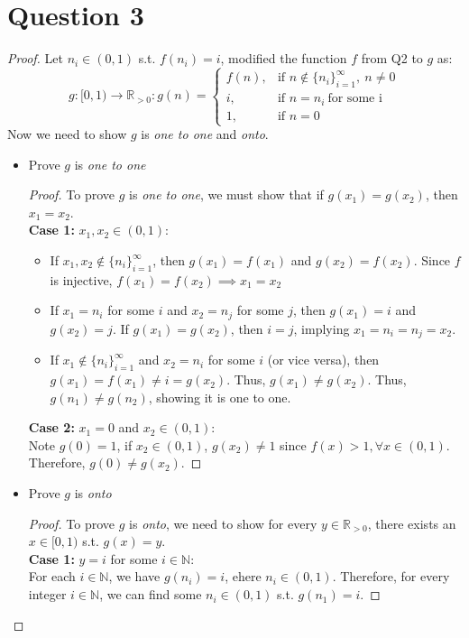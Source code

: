 \documentclass{article}
\begin{document}
\section*{Question 3}
\begin{proof}
    Let $n_i \in (0,1)$ s.t. $f(n_i) = i$, modified the function $f$ from Q2 to $g$ as:
    \[ g: [0,1) \rightarrow \mathbb{R}_{>0} 
    : g(n) =
        \begin{cases}
            f(n), & \text{if } n \notin \{n_i\}_{i=1}^{\infty}, \ n \neq 0 \\
            i, & \text{if } n = n_i \ \text{for some i} \\
            1, & \text{if } n = 0
        \end{cases}
    \]
    Now we need to show $g$ is \textit{one to one} and \textit{onto}.
    \begin{itemize}
        \item Prove $g$ is \textit{one to one}
        \begin{proof}
            To prove $g$ is \textit{one to one}, we must show that if $g(x_1) = g(x_2)$, then $x_1 = x_2$.
            \\
            \textbf{Case 1:} \( x_1, x_2 \in (0, 1) \):
            \begin{itemize}
                \item If \( x_1, x_2 \notin \{n_i\}_{i=1}^\infty \), then \( g(x_1) = f(x_1) \) and \( g(x_2) = f(x_2) \). Since \( f \) is injective, \( f(x_1) = f(x_2) \implies x_1 = x_2 \)
                \item If \( x_1 = n_i \) for some \( i \) and \( x_2 = n_j \) for some \( j \), then \( g(x_1) = i \) and \( g(x_2) = j \). If \( g(x_1) = g(x_2) \), then \( i = j \), implying \( x_1 = n_i = n_j = x_2 \).
                \item If \( x_1 \notin \{n_i\}_{i=1}^\infty \) and \( x_2 = n_i \) for some \( i \) (or vice versa), then \( g(x_1) = f(x_1) \neq i = g(x_2) \). Thus, \( g(x_1) \neq g(x_2) \).
                Thus, $g(n_1) \neq g(n_2)$, showing it is one to one.
            \end{itemize}
            
            \textbf{Case 2:} \( x_1 = 0 \) and \( x_2 \in (0,1) \):
            \\
            Note $g(0) = 1$, if $x_2 \in (0,1)$, $g(x_2) \neq 1$ since $f(x) > 1, \forall x \in (0,1)$. Therefore, $g(0) \neq g(x_2)$.
        \end{proof}
        \item Prove $g$ is \textit{onto}
        \begin{proof}
            To prove $g$ is \textit{onto}, we need to show for every $y \in \mathbb{R}_{>0}$, there exists an $x \in [0,1)$ s.t. $g(x) = y$.
            \\
            \textbf{Case 1:} \( y = i \) for some \(i \in \mathbb{N}\):
            \\
            For each $i \in \mathbb{N}$, we have $g(n_i) = i$, ehere $n_i \in (0,1)$. Therefore, for every integer $i \in \mathbb{N}$, we can find some $n_i \in (0,1)$ s.t. $g(n_1) = i$.
            

\end{proof}
\end{itemize}
\end{proof}
\end{document}
